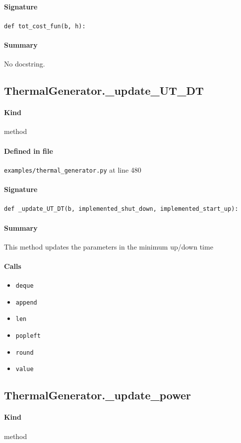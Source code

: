 \documentclass[11pt]{report}
\begin{document}
\paragraph{Signature} \texttt{def tot\_cost\_fun(b, h):}
\paragraph{Summary} No docstring.
\subsection{ThermalGenerator.\_update\_UT\_DT}
\label{def:examples-thermal_generator.py:ThermalGenerator._update_UT_DT:L480}
\paragraph{Kind} method
\paragraph{Defined in file} \texttt{examples/thermal\_generator.py} at line 480
\paragraph{Signature} \texttt{def \_update\_UT\_DT(b, implemented\_shut\_down, implemented\_start\_up):}
\paragraph{Summary} This method updates the parameters in the minimum up/down time
\paragraph{Calls}
\begin{itemize}[leftmargin=*]
  \item \texttt{deque}
  \item \texttt{append}
  \item \texttt{len}
  \item \texttt{popleft}
  \item \texttt{round}
  \item \texttt{value}
\end{itemize}
\subsection{ThermalGenerator.\_update\_power}
\label{def:examples-thermal_generator.py:ThermalGenerator._update_power:L527}
\paragraph{Kind} method
\end{document}
